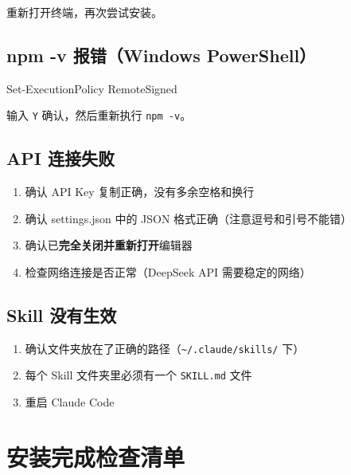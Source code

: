 \documentclass[12pt,a4paper]{ctexart}
\begin{document}
重新打开终端，再次尝试安装。

\subsection{npm -v 报错（Windows PowerShell）}

\begin{shcode}
Set-ExecutionPolicy RemoteSigned
\end{shcode}

输入 \texttt{Y} 确认，然后重新执行 \texttt{npm -v}。

\subsection{API 连接失败}

\begin{enumerate}[nosep]
    \item 确认 API Key 复制正确，没有多余空格和换行
    \item 确认 settings.json 中的 JSON 格式正确（注意逗号和引号不能错）
    \item 确认已\textbf{完全关闭并重新打开}编辑器
    \item 检查网络连接是否正常（DeepSeek API 需要稳定的网络）
\end{enumerate}

\subsection{Skill 没有生效}

\begin{enumerate}[nosep]
    \item 确认文件夹放在了正确的路径（\texttt{\textasciitilde/.claude/skills/} 下）
    \item 每个 Skill 文件夹里必须有一个 \texttt{SKILL.md} 文件
    \item 重启 Claude Code
\end{enumerate}

\section{安装完成检查清单}
\end{document}
